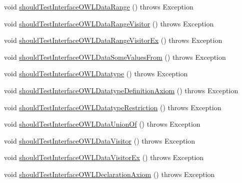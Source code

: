 \begin{DoxyCompactItemize}
\item 
void \hyperlink{classorg_1_1semanticweb_1_1owlapi_1_1contract_1_1_contract_owlapi_model__2_test_a8ced591b1b4ed940c76b342f3c5b0b47}{should\-Test\-Interface\-O\-W\-L\-Data\-Range} ()  throws Exception 
\item 
void \hyperlink{classorg_1_1semanticweb_1_1owlapi_1_1contract_1_1_contract_owlapi_model__2_test_a9b9358d48e67e660bfcbca3ae4b0c883}{should\-Test\-Interface\-O\-W\-L\-Data\-Range\-Visitor} ()  throws Exception 
\item 
void \hyperlink{classorg_1_1semanticweb_1_1owlapi_1_1contract_1_1_contract_owlapi_model__2_test_af74e940e4b584897d2a4401e71a80d84}{should\-Test\-Interface\-O\-W\-L\-Data\-Range\-Visitor\-Ex} ()  throws Exception 
\item 
void \hyperlink{classorg_1_1semanticweb_1_1owlapi_1_1contract_1_1_contract_owlapi_model__2_test_ad1c3f0ce16c0b859f5239cef7dfe34cb}{should\-Test\-Interface\-O\-W\-L\-Data\-Some\-Values\-From} ()  throws Exception 
\item 
void \hyperlink{classorg_1_1semanticweb_1_1owlapi_1_1contract_1_1_contract_owlapi_model__2_test_adbae1c8ca1b4dd784b303ddab043b640}{should\-Test\-Interface\-O\-W\-L\-Datatype} ()  throws Exception 
\item 
void \hyperlink{classorg_1_1semanticweb_1_1owlapi_1_1contract_1_1_contract_owlapi_model__2_test_ab8fcda5d577c6de585ac50780f8c71a0}{should\-Test\-Interface\-O\-W\-L\-Datatype\-Definition\-Axiom} ()  throws Exception 
\item 
void \hyperlink{classorg_1_1semanticweb_1_1owlapi_1_1contract_1_1_contract_owlapi_model__2_test_ad85d2d04de6de57777dd1fcca1a3175f}{should\-Test\-Interface\-O\-W\-L\-Datatype\-Restriction} ()  throws Exception 
\item 
void \hyperlink{classorg_1_1semanticweb_1_1owlapi_1_1contract_1_1_contract_owlapi_model__2_test_ad9fe89029996ad89c49cabaaed45d7c3}{should\-Test\-Interface\-O\-W\-L\-Data\-Union\-Of} ()  throws Exception 
\item 
void \hyperlink{classorg_1_1semanticweb_1_1owlapi_1_1contract_1_1_contract_owlapi_model__2_test_a45bc3b19845d9f2e5c089079defc98e5}{should\-Test\-Interface\-O\-W\-L\-Data\-Visitor} ()  throws Exception 
\item 
void \hyperlink{classorg_1_1semanticweb_1_1owlapi_1_1contract_1_1_contract_owlapi_model__2_test_a7c918aa3f7f3e753e4c7441b18680028}{should\-Test\-Interface\-O\-W\-L\-Data\-Visitor\-Ex} ()  throws Exception 
\item 
void \hyperlink{classorg_1_1semanticweb_1_1owlapi_1_1contract_1_1_contract_owlapi_model__2_test_a97bd2bb467f35bb76397370abceea454}{should\-Test\-Interface\-O\-W\-L\-Declaration\-Axiom} ()  throws Exception 

\end{DoxyCompactItemize}
